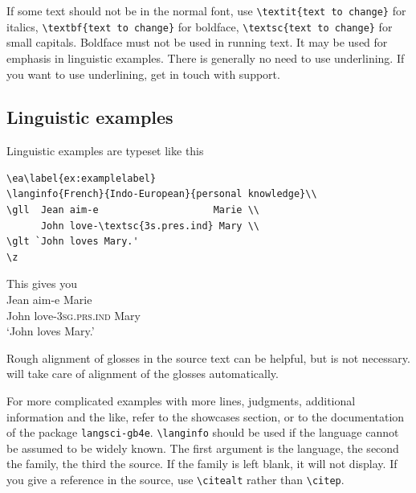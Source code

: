 If some text should not be in the normal font, use 
\verb+\textit{text to change}+ for italics, 
\verb+\textbf{text to change}+ for boldface, 
\verb+\textsc{text to change}+ for small capitals. Boldface must not be used in running text. It may be used for emphasis in linguistic examples. 
There is generally no need to use underlining. If you want to use underlining, get in touch with support.

\subsection{Linguistic examples}
Linguistic examples are typeset like this

\begin{verbatim}
\ea\label{ex:examplelabel}
\langinfo{French}{Indo-European}{personal knowledge}\\
\gll  Jean aim-e                    Marie \\
      John love-\textsc{3s.pres.ind} Mary \\
\glt `John loves Mary.'    
\z
\end{verbatim}

\newcommand{\sg}{\textsc{sg}}
\newcommand{\prs}{\textsc{prs}}
\newcommand{\ind}{\textsc{ind}}
This gives you
\ea\label{ex:examplelabel}
\\
\gll  Jean aim-e Marie \\
      John love-{3\sg.\prs.\ind} Mary \\
\glt `John loves Mary.'    
\z

Rough alignment of glosses in the source text can be helpful, but is not necessary. \latex will take care of alignment of the glosses automatically. 
% 

For more complicated examples with more lines, judgments, additional information and the like, refer to the showcases section, or to the documentation of the package \verb+langsci-gb4e+.
\verb+\langinfo+ should be used if the language cannot be assumed to be widely known. The first argument is the language, the second the family, the third the source. If the family is left blank, it will not display. If you give a reference in the source, use \verb+\citealt+ rather than \verb+\citep+.

